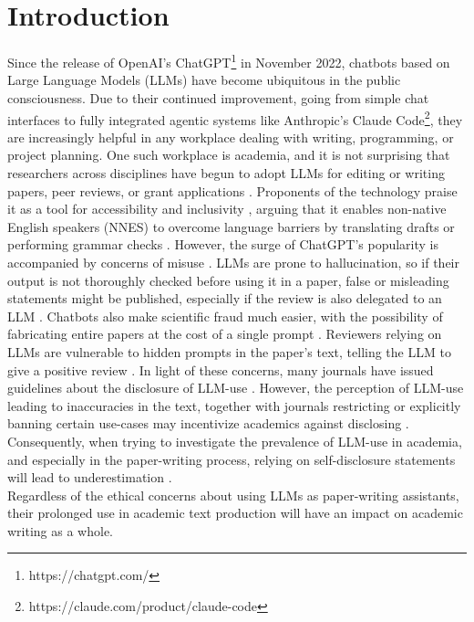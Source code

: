 \chapter{Introduction}\label{sec:intro}

Since the release of OpenAI's ChatGPT\footnote{https://chatgpt.com/} in November 2022, chatbots based on Large Language Models (LLMs) have become ubiquitous in the public consciousness.
Due to their continued improvement, going from simple chat interfaces to fully integrated agentic systems like Anthropic's Claude Code\footnote{https://claude.com/product/claude-code}, they are increasingly helpful in any workplace dealing with writing, programming, or project planning.
One such workplace is academia, and it is not surprising that researchers across disciplines have begun to adopt LLMs for editing or writing papers, peer reviews, or grant applications \cite{Kwon2025}.
Proponents of the technology praise it as a tool for accessibility and inclusivity \cite{Bao2025_linguistic, Berdejo-Espinola2023, Prakash2025}, arguing that it enables non-native English speakers (NNES) to overcome language barriers by translating drafts or performing grammar checks \cite{Kousha2025}.
However, the surge of ChatGPT's popularity is accompanied by concerns of misuse \cite{Liebrenz2023, Zheng2023}.
LLMs are prone to hallucination, so if their output is not thoroughly checked before using it in a paper, false or misleading statements might be published, especially if the review is also delegated to an LLM \cite{Alansari2026, Lindsay2023, Walters2023, Xu2025}.
Chatbots also make scientific fraud much easier, with the possibility of fabricating entire papers at the cost of a single prompt \cite{Kendall2024}.  
Reviewers relying on LLMs are vulnerable to hidden prompts in the paper's text, telling the LLM to give a positive review \cite{Lin2025_hidden_prompts}.
In light of these concerns, many journals have issued guidelines about the disclosure of LLM-use \cite{Brainard2023}. 
However, the perception of LLM-use leading to inaccuracies in the text, together with journals restricting or explicitly banning certain use-cases may incentivize academics against disclosing \cite{Thorp2023}.
Consequently, when trying to investigate the prevalence of LLM-use in academia, and especially in the paper-writing process, relying on self-disclosure statements will lead to underestimation \cite{Kousha2024, Kwon2025}.
\\
Regardless of the ethical concerns about using LLMs as paper-writing assistants, their prolonged use in academic text production will have an impact on academic writing as a whole.
